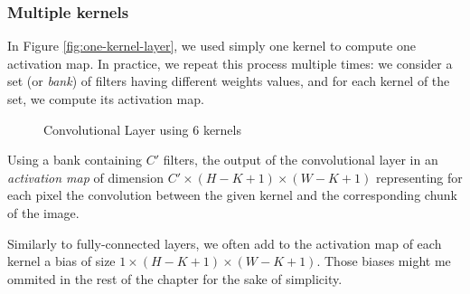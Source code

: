 \subsubsection{Multiple kernels}
In Figure \ref{fig:one-kernel-layer}, we used simply one kernel to compute one activation map. In practice, we repeat this process multiple times: we consider a set (or \emph{bank}) of filters having different weights values, and for each kernel of the set, we compute its activation map.
\begin{figure}[H]
    \centering
    \caption{Convolutional Layer using 6 kernels}
\end{figure}

Using a bank containing $C'$ filters, the output of the convolutional layer in an \emph{activation map} of dimension $C'\times (H - K + 1) \times (W - K + 1)$ representing for each pixel the convolution between the given kernel and the corresponding chunk of the image.

\begin{remark}
    Similarly to fully-connected layers, we often add to the activation map of each kernel a bias of size $1\times (H - K + 1) \times (W - K + 1)$. Those biases might me ommited in the rest of the chapter for the sake of simplicity.
\end{remark}

